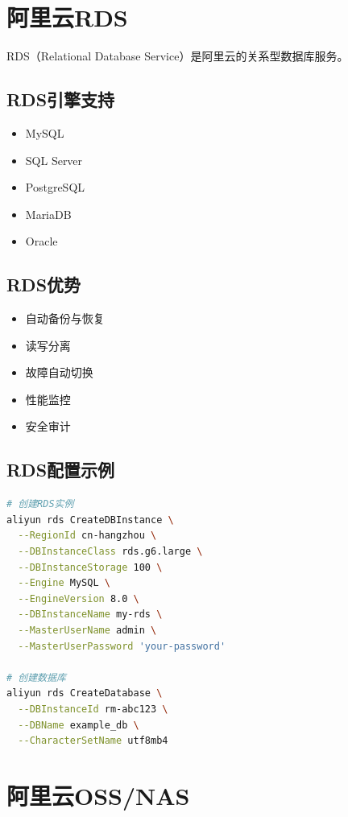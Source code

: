 \documentclass[12pt,UTF8]{ctexbook}
\begin{document}
\section{阿里云RDS}
\label{sec:aliyun-rds}

RDS（Relational Database Service）是阿里云的关系型数据库服务。

\subsection{RDS引擎支持}

\begin{itemize}
    \item MySQL
    \item SQL Server
    \item PostgreSQL
    \item MariaDB
    \item Oracle
\end{itemize}

\subsection{RDS优势}

\begin{itemize}
    \item 自动备份与恢复
    \item 读写分离
    \item 故障自动切换
    \item 性能监控
    \item 安全审计
\end{itemize}

\subsection{RDS配置示例}

\begin{lstlisting}[language=bash]
# 创建RDS实例
aliyun rds CreateDBInstance \
  --RegionId cn-hangzhou \
  --DBInstanceClass rds.g6.large \
  --DBInstanceStorage 100 \
  --Engine MySQL \
  --EngineVersion 8.0 \
  --DBInstanceName my-rds \
  --MasterUserName admin \
  --MasterUserPassword 'your-password'

# 创建数据库
aliyun rds CreateDatabase \
  --DBInstanceId rm-abc123 \
  --DBName example_db \
  --CharacterSetName utf8mb4
\end{lstlisting}

\section{阿里云OSS/NAS}
\label{sec:aliyun-oss}
\end{document}
